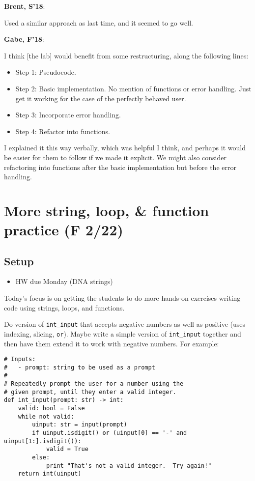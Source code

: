 \documentclass{article}
\newenvironment{reflect}[1]
{
  \noindent
  \begin{lrbox}{\reflectbox}
    \begin{minipage}[t]{\textwidth}
      \textbf{#1}:
}{
    \end{minipage}
  \end{lrbox}
  \fbox{\usebox{\reflectbox}}
}
\newcommand{\ready}{\textcolor{Green}{\Checkmark}\xspace}
\begin{document}
\begin{reflect}{Brent, S'18}
  Used a similar approach as last time, and it seemed to go well.
\end{reflect}

\begin{reflect}{Gabe, F'18}
  I think [the lab] would benefit from some restructuring, along the
  following lines:
  \begin{itemize}
  \item Step 1: Pseudocode.
  \item Step 2: Basic implementation. No mention of functions or error
    handling. Just get it working for the case of the perfectly
    behaved user.
  \item Step 3: Incorporate error handling.
  \item Step 4: Refactor into functions.
  \end{itemize}
  I explained it this way verbally, which was helpful I think, and
  perhaps it would be easier for them to follow if we made it
  explicit. We might also consider refactoring into functions after
  the basic implementation but before the error handling.
\end{reflect}

\newpage
\section{\ready More string, loop, \& function practice (F 2/22)}

\subsection*{Setup}
\begin{itemize}
\item \ready HW due Monday (DNA strings)
\end{itemize}

Today's focus is on getting the students to do more hands-on exercises
writing code using strings, loops, and functions.

Do version of \verb|int_input| that accepts negative numbers as well
as positive (uses indexing, slicing, \verb|or|). Maybe write a simple
version of \verb|int_input| together and then have them extend it to
work with negative numbers.  For example:

\begin{verbatim}
# Inputs:
#   - prompt: string to be used as a prompt
#
# Repeatedly prompt the user for a number using the
# given prompt, until they enter a valid integer.
def int_input(prompt: str) -> int:
    valid: bool = False
    while not valid:
        uinput: str = input(prompt)
        if uinput.isdigit() or (uinput[0] == '-' and uinput[1:].isdigit()):
            valid = True
        else:
            print "That's not a valid integer.  Try again!"
    return int(uinput)
\end{verbatim}
\end{document}
